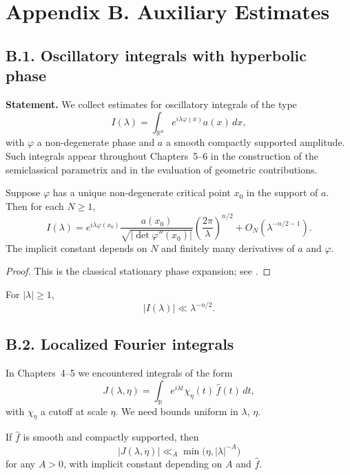 \section*{Appendix B. Auxiliary Estimates}

\subsection*{B.1. Oscillatory integrals with hyperbolic phase}

\noindent
\textbf{Statement.}
We collect estimates for oscillatory integrals of the type
\[
I(\lambda) = \int_{\mathbb R^n} e^{i\lambda\varphi(x)} a(x)\,dx,
\]
with $\varphi$ a non-degenerate phase and $a$ a smooth compactly supported
amplitude. Such integrals appear throughout Chapters~5--6 in the construction
of the semiclassical parametrix and in the evaluation of geometric contributions.

\begin{lemma}\label{lem:stationary}
Suppose $\varphi$ has a unique non-degenerate critical point $x_0$ in the
support of $a$. Then for each $N\ge 1$,
\[
I(\lambda) = e^{i\lambda \varphi(x_0)} \frac{a(x_0)}{\sqrt{|\det \varphi''(x_0)|}}
\left(\frac{2\pi}{\lambda}\right)^{n/2}
+ O_N(\lambda^{-n/2-1}).
\]
The implicit constant depends on $N$ and finitely many derivatives of $a$ and
$\varphi$.
\end{lemma}

\begin{proof}
This is the classical stationary phase expansion; see \cite[Thm.~7.7.5]{Hormander1983}.
\end{proof}

\begin{corollary}\label{cor:uniform-stationary}
For $|\lambda|\ge 1$,
\[
|I(\lambda)| \ll \lambda^{-n/2}.
\]
\end{corollary}

\subsection*{B.2. Localized Fourier integrals}

\noindent
In Chapters~4--5 we encountered integrals of the form
\[
J(\lambda,\eta) = \int_{\mathbb R} e^{i\lambda t} \chi_\eta(t)\, \hat{f}(t)\,dt,
\]
with $\chi_\eta$ a cutoff at scale $\eta$. We need bounds uniform in $\lambda$,
$\eta$.

\begin{lemma}\label{lem:decay-local}
If $\hat{f}$ is smooth and compactly supported, then
\[
|J(\lambda,\eta)| \ll_A \min\big(\eta, |\lambda|^{-A}\big)
\]
for any $A>0$, with implicit constant depending on $A$ and $\hat{f}$.
\end{lemma}

